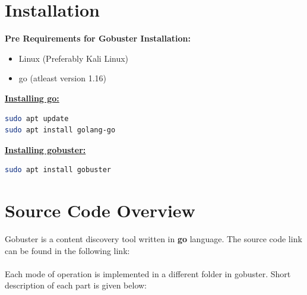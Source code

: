 \documentclass[12 pt]{article}
\begin{document}
\section{Installation}
\textbf{Pre Requirements for Gobuster Installation: }\\
\begin{itemize}
\item Linux (Preferably Kali Linux) 
\item go (atleast version 1.16)
\end{itemize}
\textbf{\underline{Installing go:} }
\begin{lstlisting}[language=bash]
sudo apt update
sudo apt install golang-go
\end{lstlisting}
\textbf{\underline{Installing gobuster:} }
\begin{lstlisting}[language=bash]
sudo apt install gobuster
\end{lstlisting}
\section{Source Code Overview}
Gobuster is a content discovery tool written in \textbf{go} language. The source code link can be found in the following link: \cite{github}\\ \\
Each mode of operation is implemented in a different folder in gobuster. Short description of each part is given below:
\end{document}
